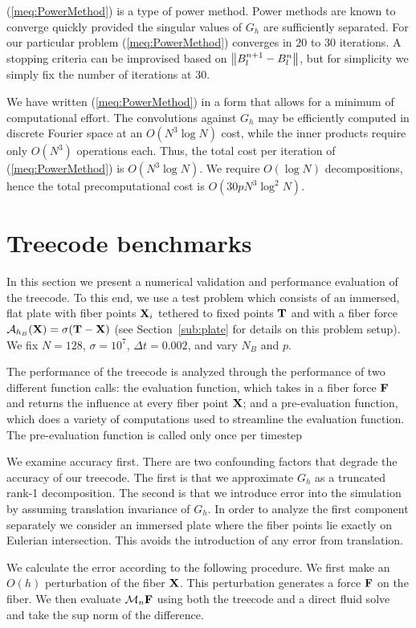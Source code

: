 (\ref{meq:PowerMethod}) is a type of power method. Power methods are known to converge quickly provided the singular values of $G_h$ are sufficiently separated. For our particular problem (\ref{meq:PowerMethod}) converges in $20$ to $30$ iterations. A stopping criteria can be improvised based on $\left\lVert B_l^{n+1} - B_l^n\right\rVert$, but for simplicity we simply fix the number of iterations at 30.

We have written (\ref{meq:PowerMethod}) in a form that allows for a minimum of computational effort. The convolutions against $G_h$ may be efficiently computed in discrete Fourier space at an $O(N^3\log N)$ cost, while the inner products require only $O(N^3)$ operations each. Thus, the total cost per iteration of (\ref{meq:PowerMethod}) is $O(N^3\log N)$. We require $O(\log N)$ decompositions, hence the total precomputational cost is $O(30pN^3\log^2 N)$.


\section{Treecode benchmarks}
\label{Sec:Teecode_Benchmarks}
In this section we present a numerical validation and performance evaluation of the treecode. To this end, we use a test problem which consists of 
an immersed, flat plate with fiber points $\mathbf{X}_i$ tethered to fixed points $\mathbf{T}$ and with a fiber force  $\mathcal{A}_{h_B}(\mathbf{X}) = \sigma(\mathbf{T} - \mathbf{X})$ (see Section~\ref{sub:plate} for details on this problem setup).  We fix $N=128$, $\sigma=10^7$, $\Delta t=0.002$,  and vary $N_B$ and $p$.

 The performance of the treecode is analyzed through the performance of two different function calls: the evaluation function, which takes in a fiber force $\mathbf{F}$ and returns the influence at every fiber point $\mathbf{X}$; and a pre-evaluation function, which does a variety of computations used to streamline the evaluation function. The pre-evaluation function is called only once per timestep

We examine accuracy first. There are two confounding factors that degrade the accuracy of our treecode. The first is that we approximate $G_h$ as a truncated rank-1 decomposition. The second is that we introduce error into the simulation by assuming translation invariance of $G_h$. In order to analyze the first component separately we consider an immersed plate where the fiber points lie exactly on Eulerian intersection. This avoids the introduction of any error from translation.

We calculate the error according to the following procedure. We first make an $O(h)$ perturbation of the fiber $\mathbf{X}$. This perturbation generates a force $\mathbf{F}$ on the fiber. We then evaluate $\mathcal{M}_n\mathbf{F}$ using both the treecode and a direct fluid solve and take the sup norm of the difference.


